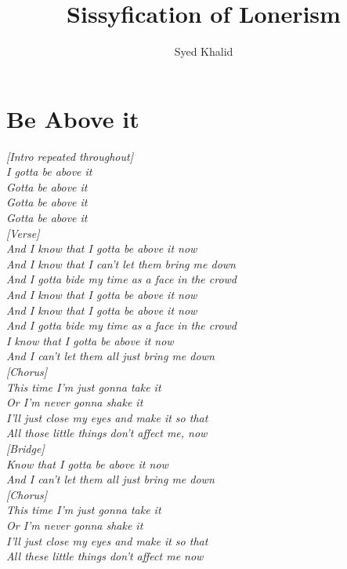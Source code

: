 \documentclass[15pt]{article}
\title{\textbf{Sissyfication of Lonerism}}
\author{Syed Khalid}
\begin{document}
\maketitle
\section{Be Above it}%
  \label{sec:Be Above it}
  \it {[Intro repeated throughout] \\ 
I gotta be above it \\
Gotta be above it \\
Gotta be above it \\
Gotta be above it \\

[Verse] \\
And I know that I gotta be above it now \\
And I know that I can't let them bring me down \\
And I gotta bide my time as a face in the crowd \\
And I know that I gotta be above it now \\
And I know that I gotta be above it now \\
And I gotta bide my time as a face in the crowd \\
I know that I gotta be above it now \\
And I can't let them all just bring me down \\


[Chorus] \\
This time I'm just gonna take it \\
Or I'm never gonna shake it \\
I'll just close my eyes and make it so that \\
All those little things don't affect me, now \\

[Bridge] \\
Know that I gotta be above it now \\
And I can't let them all just bring me down \\

[Chorus] \\
This time I'm just gonna take it \\
Or I'm never gonna shake it \\
I'll just close my eyes and make it so that \\
All these little things don't affect me now 
} 
\end{document}
